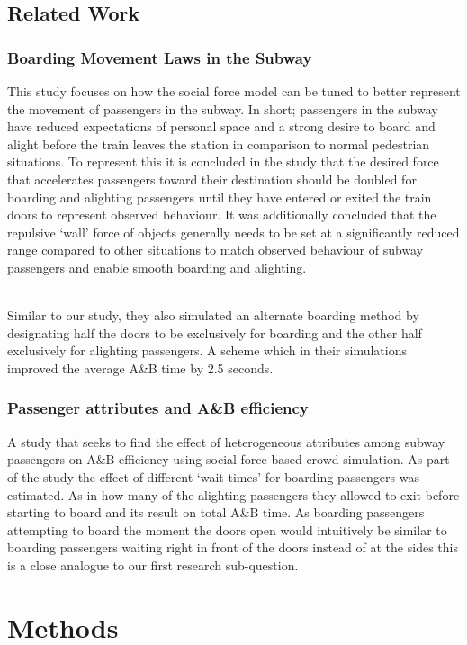 \documentclass{kththesis}
\begin{document}
\section{Related Work}

\subsection{Boarding Movement Laws in the Subway}
This study \parencite{chen2020} focuses on how the social force model can be tuned to better represent the movement of passengers in the subway. In short; passengers in the subway have reduced expectations of personal space and a strong desire to board and alight before the train leaves the station in comparison to normal pedestrian situations. To represent this it is concluded in the study that the desired force that accelerates passengers toward their destination should be doubled for boarding and alighting passengers until they have entered or exited the train doors to represent observed behaviour. It was additionally concluded that the repulsive ‘wall’ force of objects generally needs to be set at a significantly reduced range compared to other situations to match observed behaviour of subway passengers and enable smooth boarding and alighting.

\noindent
\\
Similar to our study, they also simulated an alternate boarding method by designating half the doors to be exclusively for boarding and the other half exclusively for alighting passengers. A scheme which in their simulations improved the average A\&B time by 2.5 seconds.


\subsection{Passenger attributes and A\&B efficiency}
A study \parencite{yang2021} that seeks to find the effect of heterogeneous attributes among subway passengers on A\&B efficiency using social force based crowd simulation. As part of the study the effect of different ‘wait-times’ for boarding passengers was estimated. As in how many of the alighting passengers they allowed to exit before starting to board and its result on total A\&B time. As boarding passengers attempting to board the moment the doors open would intuitively be similar to boarding passengers waiting right in front of the doors instead of at the sides this is a close analogue to our first research sub-question.

\chapter{Methods}
\end{document}
